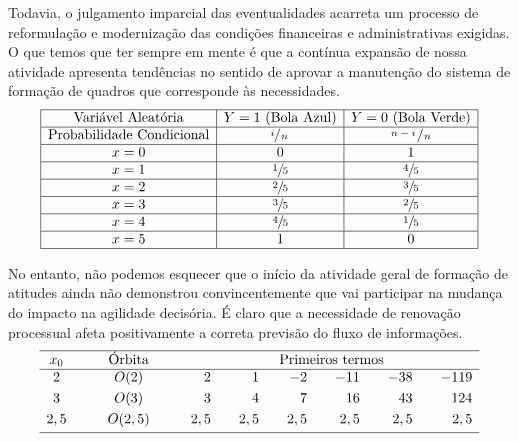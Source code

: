 \documentclass[fleqn]{profmat-cefet}
\begin{document}
Todavia, o julgamento imparcial das eventualidades acarreta um processo de 
reformulação e modernização das condições financeiras e administrativas exigidas. 
O que temos que ter sempre em mente é que a contínua expansão de nossa atividade 
apresenta tendências no sentido de aprovar a manutenção do sistema de formação de 
quadros que corresponde às necessidades. 
\[
\begin{array}{|c|c|c|}
	\hline
	   \text{Variável Aleatória}     & Y=1 \text{ (Bola Azul)} & Y=0 \text{ (Bola Verde)} \\ \hline
	\text{Probabilidade Condicional} &    \sfrac{i}{\,n\,}     &  \sfrac{\,n-i\,}{\,n\,}  \\ \hline
	              x=0                &            0            &            1             \\ \hline
	              x=1                &      \sfrac{1}{5}       &       \sfrac{4}{5}       \\ \hline
	              x=2                &      \sfrac{2}{5}       &       \sfrac{3}{5}       \\ \hline
	              x=3                &      \sfrac{3}{5}       &       \sfrac{2}{5}       \\ \hline
	              x=4                &      \sfrac{4}{5}       &       \sfrac{1}{5}       \\ \hline
	              x=5                &            1            &            0             \\ \hline
\end{array}
\]

No entanto, não podemos esquecer que o início da atividade geral de formação de
atitudes ainda não demonstrou convincentemente que vai participar na mudança do
impacto na agilidade decisória. É claro que a necessidade de renovação
processual afeta positivamente a correta previsão do fluxo de informações. 
\[
\begin{array}{ccrrrrrr}
	\hline
	x_0 & {\qquad \text{Órbita} \qquad} &                \multicolumn{6}{c}{\text{Primeiros termos}}                \\ \hline
	 2  &            O(2  )             &   2 & \quad   1 & \quad   -2 & \quad  -11 & \quad  -38 & \quad -119 \quad \\[1mm]
	 3  &            O(3  )             &   3 & \quad   4 & \quad    7 & \quad   16 & \quad   43 & \quad  124 \quad \\[1mm]
	2,5 &            O(2,5)             & 2,5 & \quad 2,5 & \quad  2,5 & \quad  2,5 & \quad  2,5 & \quad  2,5 \quad \\[1mm] \hline
\end{array}
\]
\end{document}
